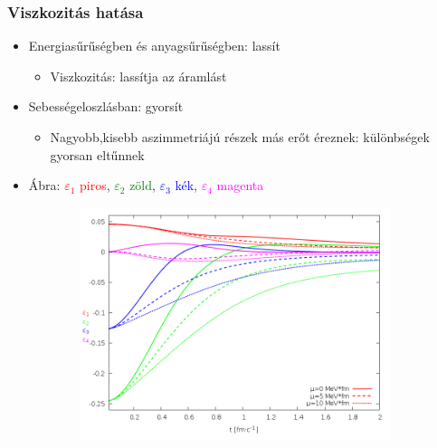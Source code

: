 \documentclass{beamer}
\begin{document}
\begin{frame}
\frametitle{Viszkozitás hatása}
\begin{center}
\begin{itemize}
  \setlength{\itemsep}{2pt}

\item<1-> Energiasűrűségben és  anyagsűrűségben: lassít
\begin{itemize}
\item<1-> Viszkozitás: lassítja az áramlást
\end{itemize}
\item<2-> Sebességeloszlásban: gyorsít
\begin{itemize}
\item<2-> Nagyobb,kisebb aszimmetriájú részek más erőt éreznek: különbségek gyorsan eltűnnek
\end{itemize}
\item Ábra: \large{\textcolor{red}{$\varepsilon_1$ piros}, \textcolor{green}{$\varepsilon_2$ zöld}, \textcolor{blue}{$\varepsilon_3$ kék},  \textcolor{magenta}{$\varepsilon_4$ magenta}}
\end{itemize}
\begin{figure}[H]
	\centering
    \begin{subfigure}[b]{0.49\textwidth}
    		\includegraphics[width=\textwidth]{pic/res/nonrel/eps_visc_r}
	\end{subfigure}
	\begin{subfigure}[b]{0.49\textwidth}

\end{subfigure}
\end{figure}
\end{center}
\end{frame}
\end{document}
